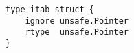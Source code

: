 \begin{lstlisting}[language=Golang, label=lst:labels-classexample-data-structure, caption=Usage class example: data-structure]
type itab struct {
    ignore unsafe.Pointer
    rtype  unsafe.Pointer
}
\end{lstlisting}